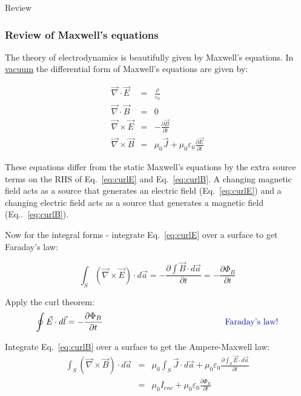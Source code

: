 \documentclass[12pt]{article}
\begin{document}
\begin{flushright} {\color{blue} Review} \end{flushright}
\begin{flushleft}

\subsubsection*{\color{myblue} \bf Review of Maxwell's equations}

The theory of electrodynamics is beautifully given by Maxwell's equations.  In \underline{vacuum} the differential form of Maxwell's equations are given by:

\begin{eqnarray}
 \vec{\nabla} \cdot \vec{E} & = & \frac{\rho}{\varepsilon_{0}} \nonumber \\
 \vec{\nabla} \cdot \vec{B} & = & 0 \nonumber \\
 \vec{\nabla} \times \vec{E} & = & -\frac{\partial \vec{B}}{\partial t} \label{eq:curlE} \\
\vec{\nabla} \times \vec{B} & = & \mu_{0}\vec{J}+\mu_{0}\varepsilon_{0}\frac{\partial \vec{E}}{\partial t} \label{eq:curlB} 
\end{eqnarray}

These equations differ from the static Maxwell's equations by the extra source terms on the RHS of Eq.~\ref{eq:curlE} and Eq.~\ref{eq:curlB}.  A changing magnetic field acts as a source that generates an electric field (Eq.~\ref{eq:curlE}) and a changing electric field acts as a source that generates a magnetic field (Eq..~\ref{eq:curlB}).

Now for the integral forms - integrate Eq.~\ref{eq:curlE} over a surface to get Faraday's law:

\begin{equation*}
\int_{S} (\vec{\nabla} \times \vec{E}) \cdot d\vec{a}  =  -\frac{\partial \int \vec{B} \cdot d\vec{a} }{\partial t} = -\frac{\partial \Phi_{B} }{\partial t}
\end{equation*}

Apply the curl theorem:
\begin{equation*}
\oint \vec{E} \cdot d\vec{l}  =  -\frac{\partial \Phi_{B} }{\partial t} \hspace{2.in} \mbox{\color{myblue} Faraday's law!}
\end{equation*}

Integrate Eq.~\ref{eq:curlB} over a surface to get the Ampere-Maxwell law:
\begin{eqnarray*}
\int_{S} (\vec{\nabla} \times \vec{B}) \cdot d\vec{a}  & =  & \mu_{0}\int_{S} \vec{J} \cdot d\vec{a} + \mu_{0}\varepsilon_{0}\frac{\partial \int_{S} \vec{E} \cdot d\vec{a} }{\partial t} \\ 
& = & \mu_{0}I_{enc} + \mu_{0}\varepsilon_{0}\frac{\partial \Phi_{E} }{\partial t}
\end{eqnarray*}


\end{flushleft}
\end{document}
